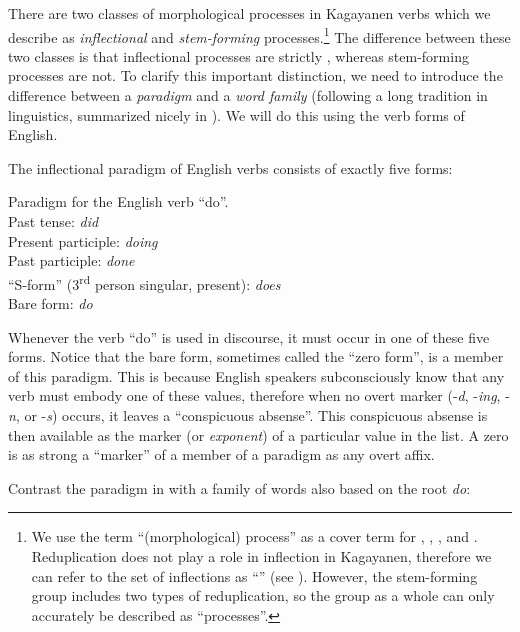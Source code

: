 There are two classes of morphological processes in Kagayanen verbs which we describe as \textit{inflectional} and \textit{stem-forming} processes.\footnote{We use the term “(morphological) process” as a cover term for , , , and . Reduplication does not play a role in inflection in Kagayanen, therefore we can refer to the set of inflections as “” (see ). However, the stem-forming group includes two types of reduplication, so the group as a whole can only accurately be described as “processes”.}  The difference between these two classes is that inflectional processes are strictly , whereas stem-forming processes are not. To clarify this important distinction, we need to introduce the difference between a \textit{paradigm} and a \textit{word family} (following a long tradition in linguistics, summarized nicely in \citealt[14]{haspelmath2002}). We will do this using the verb forms of English.

The inflectional paradigm of English verbs consists of exactly five forms:

\ea
\label{bkm:Ref59175832}
Paradigm for the English verb “do”. \\
Past tense:        \textit{did} \\
Present participle:        \textit{doing} \\
Past participle:      \textit{done} \\
“S-form” (3\textsuperscript{rd} person singular, present):  \textit{does} \\
Bare form:    \textit{do}
\z

Whenever the verb “do” is used in discourse, it must occur in one of these five forms. Notice that the bare form, sometimes called the “zero form”, is a member of this paradigm. This is because English speakers subconsciously know that any verb must embody one of these values, therefore when no overt marker (-\textit{d}, -\textit{ing}, -\textit{n}, or -\textit{s}) occurs, it leaves a “conspicuous absense”. This conspicuous absense is then available as the marker (or \textit{exponent}) of a particular value in the list. A zero is as strong a “marker” of a member of a paradigm as any overt affix.

Contrast the paradigm in  with a family of words also based on the root \textit{do}:

